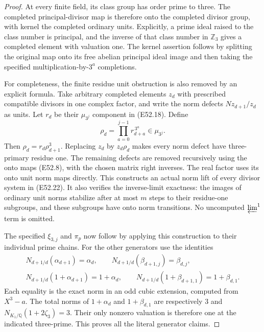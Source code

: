 \begin{proof}
At every finite
field, its class
group has order
prime to three.
The completed
principal-divisor
map is therefore
onto the completed
divisor group, with
kernel the completed
ordinary units.
Explicitly, a prime
ideal raised to the
class number is
principal, and the
inverse of that
class number in
$\mathbb Z_3$ gives
a completed element
with valuation one.
The kernel assertion
follows by splitting
the original map
onto its free
abelian principal
ideal image and
then taking the
specified
multiplication-by-$3^a$
completions.

For completeness,
the finite residue
unit obstruction is
also removed by
an explicit formula.
Take arbitrary
completed elements
$z_d$ with prescribed
compatible divisors
in one complex
factor, and write
the norm defects
$N z_{d+1}/z_d$ as
units. Let $r_d$
be their
$\mu_{3^j}$ component
in (E52.18). Define
\[
        \rho_d
         =\prod_{a=0}^{j-1}r_{d+a}^{\,3^a}
                \in\mu_{3^j}.
 \tag{E52.23}
\]
Then
$\rho_d=r_d\rho_{d+1}^3$.
Replacing $z_d$
by $z_d\rho_d$
makes every norm
defect have
three-primary
residue one.
The remaining
defects are removed
recursively using
the onto maps
(E52.8), with
the chosen matrix
right inverses.
The real factor
uses its onto
unit norm maps
directly.
This constructs
an actual norm
lift of every
divisor system
in (E52.22).
It also verifies
the inverse-limit
exactness: the
images of ordinary
unit norms stabilize
after at most $m$
steps to their
residue-one subgroups,
and these subgroups
have onto norm
transitions.
No uncomputed
$\varprojlim^1$
term is omitted.

The specified
$\xi_{3,j}$ and
$\pi_p$ now follow
by applying this
construction to
their individual
prime chains.
For the other
generators use
the identities
\[
 \begin{gathered}
 N_{d+1/d}(\alpha_{d+1})=\alpha_d,\qquad
 N_{d+1/d}(\beta_{d+1,j})=\beta_{d,j},\\
 N_{d+1/d}(1+\alpha_{d+1})=1+\alpha_d,\qquad
 N_{d+1/d}(1+\beta_{d+1,1})=1+\beta_{d,1}.
 \end{gathered}
 \tag{E52.24}
\]
Each equality is
the exact norm in
an odd cubic
extension, computed
from $X^3-a$.
The total norms
of $1+\alpha_d$
and $1+\beta_{d,1}$
are respectively
$3$ and
$N_{K_1/\mathbb Q}(1+2\zeta_3)=3$.
Their only
nonzero valuation
is therefore one
at the indicated
three-prime.
This proves all
the literal
generator claims.


\end{proof}
